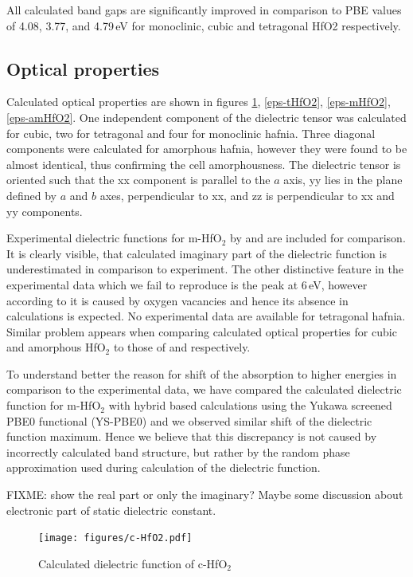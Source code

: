 \documentclass[10pt,a4paper,twocolumn]{article}
\begin{document}
All calculated band gaps are significantly improved in comparison to PBE values of 4.08, 3.77, and 4.79\,eV for monoclinic, cubic and tetragonal HfO2 respectively.

\subsection{Optical properties}

Calculated optical properties are shown in figures \ref{eps-cHfO2}, \ref{eps-tHfO2}, \ref{eps-mHfO2}, \ref{eps-amHfO2}.
One independent component of the dielectric tensor was calculated for cubic, two for tetragonal and four for monoclinic hafnia.
Three diagonal components were calculated for amorphous hafnia, however they were found to be almost identical, thus confirming the cell amorphousness.
The dielectric tensor is oriented such that the xx component is parallel to the $a$ axis, yy lies in the plane defined by $a$ and $b$ axes, perpendicular to xx, and zz is perpendicular to xx and yy components.

Experimental dielectric functions for m-HfO$_2$ by \citet{Edwards2003} and \citet{Nguyen2005} are included for comparison.
It is clearly visible, that calculated imaginary part of the dielectric function is underestimated in comparison to experiment.
The other distinctive feature in the experimental data which we fail to reproduce is the peak at 6\,eV, however according to \cite{Takeuchi2004} it is caused by oxygen vacancies and hence its absence in calculations is expected.
No experimental data are available for tetragonal hafnia.
Similar problem appears when comparing calculated optical properties for cubic and amorphous HfO$_2$ to those of \citet{Lim2002} and \citet{Nguyen2005} respectively.

To understand better the reason for shift of the absorption to higher energies in comparison to the experimental data, we have compared the calculated dielectric function for m-HfO$_2$ with hybrid based calculations using the Yukawa screened PBE0 functional (YS-PBE0) \cite{Tran2011} and we observed similar shift of the dielectric function maximum.
Hence we believe that this discrepancy is not caused by incorrectly calculated band structure, but rather by the random phase approximation used during calculation of the dielectric function.

FIXME: show the real part or only the imaginary? Maybe some discussion about electronic part of static dielectric constant.

\begin{figure}
\begin{center}
	\texttt{[image: figures/c-HfO2.pdf]}
	\caption{Calculated dielectric function of c-HfO$_2$}
   \label{eps-cHfO2}
\end{center}
\end{figure}
\end{document}
